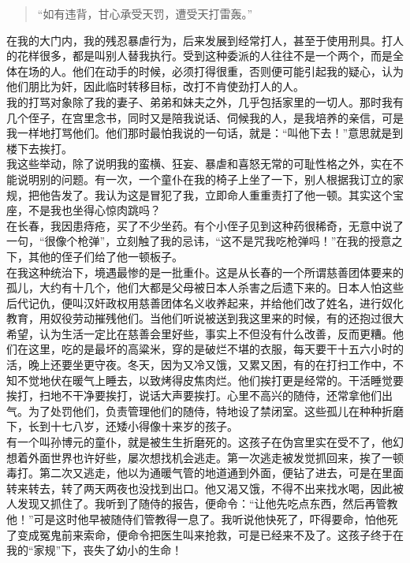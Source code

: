 \begin{quote}
	“如有违背，甘心承受天罚，遭受天打雷轰。”\\
\end{quote}

在我的大门内，我的残忍暴虐行为，后来发展到经常打人，甚至于使用刑具。打人的花样很多，都是叫别人替我执行。受到这种委派的人往往不是一个两个，而是全体在场的人。他们在动手的时候，必须打得很重，否则便可能引起我的疑心，认为他们朋比为奸，因此临时转移目标，改打不肯使劲打人的人。\\

我的打骂对象除了我的妻子、弟弟和妹夫之外，几乎包括家里的一切人。那时我有几个侄子，在宫里念书，同时又是陪我说话、伺候我的人，是我培养的亲信，可是我一样地打骂他们。他们那时最怕我说的一句话，就是：“叫他下去！”意思就是到楼下去挨打。\\

我这些举动，除了说明我的蛮横、狂妄、暴虐和喜怒无常的可耻性格之外，实在不能说明别的问题。有一次，一个童仆在我的椅子上坐了一下，别人根据我订立的家规，把他告发了。我认为这是冒犯了我，立即命人重重责打了他一顿。其实这个宝座，不是我也坐得心惊肉跳吗？\\

在长春，我因患痔疮，买了不少坐药。有个小侄子见到这种药很稀奇，无意中说了一句，“很像个枪弹”，立刻触了我的忌讳，“这不是咒我吃枪弹吗！”在我的授意之下，其他的侄子们给了他一顿板子。\\

在我这种统治下，境遇最惨的是一批重仆。这是从长春的一个所谓慈善团体要来的孤儿，大约有十几个，他们大都是父母被日本人杀害之后遗下来的。日本人怕这些后代记仇，便叫汉奸政权用慈善团体名义收养起来，并给他们改了姓名，进行奴化教育，用奴役劳动摧残他们。当他们听说被送到我这里来的时候，有的还抱过很大希望，认为生活一定比在慈善会里好些，事实上不但没有什么改善，反而更糟。他们在这里，吃的是最坏的高粱米，穿的是破烂不堪的衣服，每天要干十五六小时的活，晚上还要坐更守夜。冬天，因为又冷又饿，又累又困，有的在打扫工作中，不知不觉地伏在暖气上睡去，以致烤得皮焦肉烂。他们挨打更是经常的。干活睡觉要挨打，扫地不干净要挨打，说话大声要挨打。心里不高兴的随侍，还常拿他们出气。为了处罚他们，负责管理他们的随侍，特地设了禁闭室。这些孤儿在种种折磨下，长到十七八岁，还矮小得像十来岁的孩子。\\

有一个叫孙博元的童仆，就是被生生折磨死的。这孩子在伪宫里实在受不了，他幻想着外面世界也许好些，屡次想找机会逃走。第一次逃走被发觉抓回来，挨了一顿毒打。第二次又逃走，他以为通暖气管的地道通到外面，便钻了进去，可是在里面转来转去，转了两天两夜也没找到出口。他又渴又饿，不得不出来找水喝，因此被人发现又抓住了。我听到了随侍的报告，便命令：“让他先吃点东西，然后再管教他！”可是这时他早被随侍们管教得一息了。我听说他快死了，吓得要命，怕他死了变成冤鬼前来索命，便命令把医生叫来抢救，可是已经来不及了。这孩子终于在我的“家规”下，丧失了幼小的生命！\\

